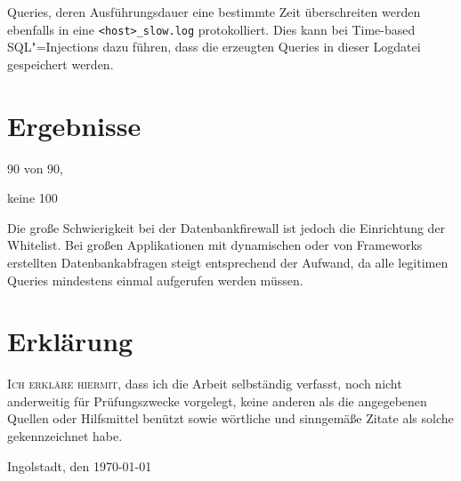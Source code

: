 Queries, deren Ausführungsdauer eine bestimmte Zeit überschreiten  werden ebenfalls in eine \texttt{<host>\_slow.log} protokolliert. Dies kann bei Time-based SQL"=Injections dazu führen, dass die erzeugten Queries in dieser Logdatei gespeichert werden.

\chapter{Ergebnisse}

90 von 90,

keine 100%

Die große Schwierigkeit bei der Datenbankfirewall ist jedoch die Einrichtung der Whitelist. Bei großen Applikationen mit dynamischen oder von Frameworks erstellten Datenbankabfragen steigt entsprechend der Aufwand, da alle legitimen Queries mindestens einmal aufgerufen werden müssen.

\printbibliography


\chapter*{Erklärung}
\lettrine{I}{ch erkläre hiermit,} dass ich die Arbeit selbständig verfasst, noch nicht anderweitig für Prüfungszwecke vorgelegt, keine anderen als die angegebenen Quellen oder Hilfsmittel benützt sowie wörtliche und sinngemäße Zitate als solche gekennzeichnet habe.

\vspace{3\baselineskip}
\noindent Ingolstadt, den \today

\par\noindent\makebox[2.5in]{} \hfill{}%
\\[-1cm]




